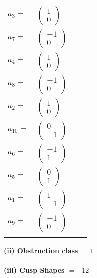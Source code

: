 \documentclass[1p]{elsarticle_modified}
\theoremstyle{definition}
\begin{document}
\begin{tabular}{m{7pt} m{180pt} m{7pt} m{180pt} }
\flushright $a_{3}=$&$\begin{pmatrix}1\\0\end{pmatrix}$ \\
\flushright $a_{7}=$&$\begin{pmatrix}-1\\0\end{pmatrix}$ \\
\flushright $a_{4}=$&$\begin{pmatrix}1\\0\end{pmatrix}$ \\
\flushright $a_{8}=$&$\begin{pmatrix}-1\\0\end{pmatrix}$ \\
\flushright $a_{2}=$&$\begin{pmatrix}1\\0\end{pmatrix}$ \\
\flushright $a_{10}=$&$\begin{pmatrix}0\\-1\end{pmatrix}$ \\
\flushright $a_{6}=$&$\begin{pmatrix}-1\\1\end{pmatrix}$ \\
\flushright $a_{5}=$&$\begin{pmatrix}0\\1\end{pmatrix}$ \\
\flushright $a_{1}=$&$\begin{pmatrix}1\\-1\end{pmatrix}$ \\
\flushright $a_{9}=$&$\begin{pmatrix}-1\\0\end{pmatrix}$\\&\end{tabular}
\flushleft \textbf{(ii) Obstruction class $= 1$}\\~\\
\flushleft \textbf{(iii) Cusp Shapes $= -12$}\\~\\
\end{document}
